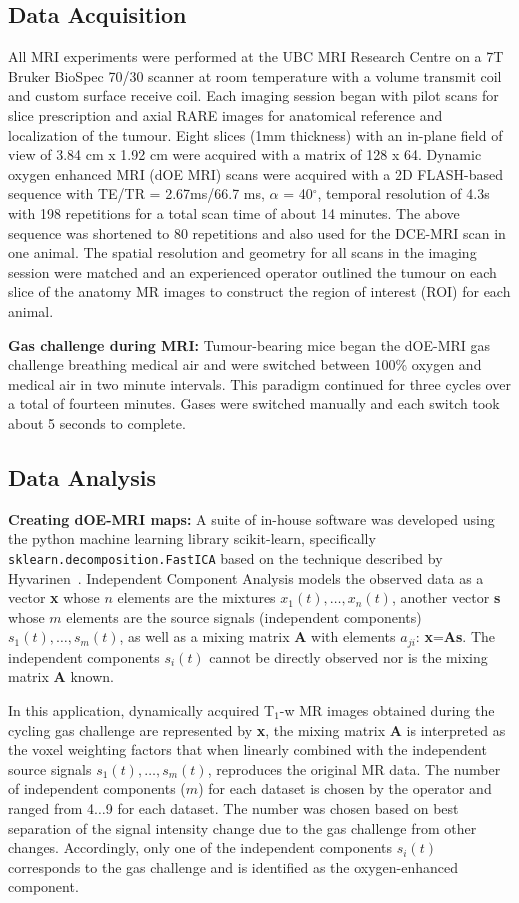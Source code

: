 \subsection{Data Acquisition}
All MRI experiments were performed at the UBC MRI Research Centre on a 7T Bruker BioSpec 70/30 scanner at room temperature with a volume transmit coil and custom surface receive coil.
Each imaging session began with pilot scans for slice prescription and axial RARE images for anatomical reference and localization of the tumour.
Eight slices (1mm thickness) with an in-plane field of view of 3.84 cm x 1.92 cm were acquired with a matrix of 128 x 64.
Dynamic oxygen enhanced MRI (dOE MRI) scans were acquired with a 2D FLASH-based sequence with TE/TR = 2.67ms/66.7 ms, $\alpha$ = 40$^\circ$, temporal resolution of 4.3s with 198 repetitions for a total scan time of about 14 minutes.
The above sequence was shortened to 80 repetitions and also used for the DCE-MRI scan in one animal.
The spatial resolution and geometry for all scans in the imaging session were matched and an experienced operator outlined the tumour on each slice of the anatomy MR images to construct the region of interest (ROI) for each animal.

\noindent\textbf{Gas challenge during MRI:} Tumour-bearing mice began the dOE-MRI gas challenge breathing medical air and were switched between 100\% oxygen and medical air in two minute intervals.
This paradigm continued for three cycles over a total of fourteen minutes.
Gases were switched manually and each switch took about 5 seconds to complete.


\subsection{Data Analysis}
\textbf{Creating dOE-MRI maps:} A suite of in-house software was developed using the python machine learning library scikit-learn, specifically \texttt{sklearn.decomposition.FastICA} based on the technique described by Hyvarinen~\cite{Hyvarinen:2000vk}.
Independent Component Analysis models the observed data as a vector \textbf{x} whose $n$ elements are the mixtures $x_1(t),\ldots,x _n(t)$, another vector \textbf{s} whose $m$ elements are the source signals (independent components) $s_1(t),\ldots,s _m(t)$, as well as a mixing matrix \textbf{A} with elements $a_{ji}$: \textbf{x}=\textbf{A}\textbf{s}.
The independent components $s_i(t)$ cannot be directly observed nor is the mixing matrix \textbf{A} known.

In this application, dynamically acquired T$_1$-w MR images obtained during the cycling gas challenge are represented by \textbf{x}, the mixing matrix \textbf{A} is interpreted as the voxel weighting factors that when linearly combined with the independent source signals $s_1(t),\ldots, s_m(t)$, reproduces the original MR data.
The number of independent components ($m$) for each dataset is chosen by the operator and  ranged from 4$\ldots$9 for each dataset.
The number was chosen based on best separation of the signal intensity change due to the gas challenge from other changes.
Accordingly, only one of the independent components $s_i(t)$ corresponds to the gas challenge and is identified as the oxygen-enhanced component.

